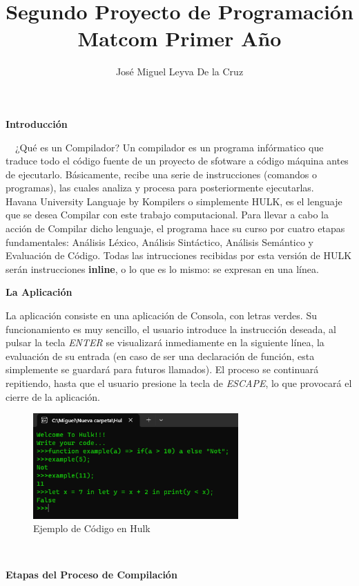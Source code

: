\documentclass[10pt,a4paper]{article}
\author{Jos\'e Miguel Leyva De la Cruz}
\title{Segundo Proyecto de Programaci\'on Matcom Primer A\~no}
\date{}
\begin{document}
\maketitle
\begin{center}
\textbf{Introducci\'on}
\end{center}
~~¿Qué es un Compilador? Un compilador es un programa infórmatico que traduce todo el código fuente de un proyecto de sfotware a código máquina antes de ejecutarlo. Básicamente, recibe una serie de instrucciones (comandos o programas), las cuales analiza y procesa para posteriormente ejecutarlas.\\

Havana University Languaje by Kompilers o simplemente HULK, es el lenguaje que se desea Compilar con este trabajo computacional. Para llevar a cabo la acci\'on de Compilar dicho lenguaje, el programa hace su curso por cuatro etapas fundamentales: An\'alisis L\'exico, An\'alisis Sint\'actico, An\'alisis Sem\'antico y Evaluaci\'on de C\'odigo. Todas las intrucciones recibidas por esta versi\'on de HULK ser\'an instrucciones \textbf{inline}, o lo que es lo mismo: se expresan en una l\'inea.\\
\begin{center}
\textbf{La Aplicaci\'on}
\end{center}
La aplicaci\'on consiste en una aplicaci\'on de Consola, con letras verdes. Su funcionamiento es muy sencillo, el usuario introduce la instrucci\'on deseada, al pulsar la tecla \textit{ENTER} se visualizar\'a inmediamente en la siguiente l\'inea, la evaluaci\'on de su entrada (en caso de ser una declaraci\'on de funci\'on, esta simplemente se guardar\'a para futuros llamados). El proceso se continuar\'a repitiendo, hasta que el usuario presione la tecla de \textit{ESCAPE}, lo que provocar\'a el cierre de la aplicaci\'on.

\begin{figure}[!h] \label{Ejemplo}
\centering
\includegraphics[width = 0.7\textwidth]{Example.png}
\caption{Ejemplo de C\'odigo en Hulk}
\end{figure}
~
\begin{center}
\textbf{Etapas del Proceso de Compilaci\'on}
\end{center}
\end{document}
